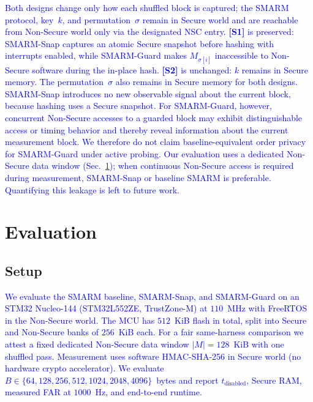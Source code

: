 \documentclass[conference]{IEEEtran}
\newcommand{\tdis}{$t_{\mathrm{disabled}}$\xspace}
\newcommand{\smarmcopy}{SMARM-Snap\xspace}
\newcommand{\smarmlock}{SMARM-Guard\xspace}
\newcommand\ben[1]{\textcolor{blue}{#1}}
\begin{document}
\ben{Both designs change only how each shuffled block is captured; the SMARM protocol, key~$k$, and permutation~$\sigma$ remain in Secure world and are reachable from Non-Secure world only via the designated NSC entry.
\textbf{[S1]} is preserved: \smarmcopy{} captures an atomic Secure snapshot before hashing with interrupts enabled, while \smarmlock{} makes $M_{\sigma[i]}$ inaccessible to Non-Secure software during the in-place hash.
\textbf{[S2]} is unchanged: $k$ remains in Secure memory.
The permutation~$\sigma$ also remains in Secure memory for both designs.
\smarmcopy{} introduces no new observable signal about the current block, because hashing uses a Secure snapshot.
For \smarmlock{}, however, concurrent Non-Secure accesses to a guarded block may exhibit distinguishable access or timing behavior and thereby reveal information about the current measurement block.
We therefore do not claim baseline-equivalent order privacy for \smarmlock{} under active probing.
Our evaluation uses a dedicated Non-Secure data window (Sec.~\ref{sec:eval}); when continuous Non-Secure access is required during measurement, \smarmcopy{} or baseline SMARM is preferable.
Quantifying this leakage is left to future work.}


\section{Evaluation}
\label{sec:eval}

\subsection{Setup}

\ben{We evaluate the SMARM baseline, \smarmcopy, and \smarmlock on an STM32 Nucleo-144 (STM32L552ZE, TrustZone-M) at $110$~MHz with FreeRTOS in the Non-Secure world. The MCU has $512$~KiB flash in total, split into Secure and Non-Secure banks of $256$~KiB each. For a fair same-harness comparison we attest a fixed dedicated Non-Secure data window $|M|{=}128$~KiB with one shuffled pass. Measurement uses software HMAC-SHA-256 in Secure world (no hardware crypto accelerator). We evaluate $B\in\{64,128,256,512,1024,2048,4096\}$~bytes and report \tdis, Secure RAM, measured FAR at $1000$~Hz, and end-to-end runtime.}
\end{document}

